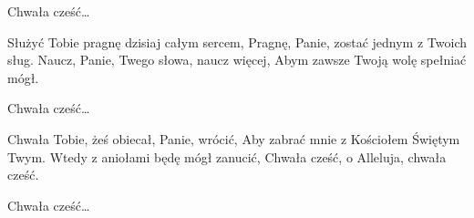 \documentclass[../../../songbook.tex]{subfiles}
\begin{document}
\-\hspace{1cm} Chwała cześć…			\newline

Służyć Tobie pragnę dzisiaj całym sercem, 			\newline
Pragnę, Panie, zostać jednym z Twoich sług. 			\newline
Naucz, Panie, Twego słowa, naucz więcej, 			\newline
Abym zawsze Twoją wolę spełniać mógł. 			\newline

\-\hspace{1cm} Chwała cześć…			\newline

Chwała Tobie, żeś obiecał, Panie, wrócić, 			\newline
Aby zabrać mnie z Kościołem Świętym Twym. 			\newline
Wtedy z aniołami będę mógł zanucić, 			\newline
Chwała cześć, o Alleluja, chwała cześć. 			\newline

\-\hspace{1cm} Chwała cześć…			\newline
\end{document}
